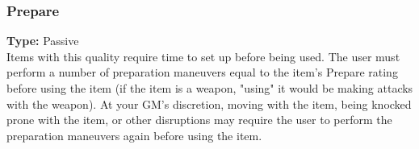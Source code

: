 \subsubsection{Prepare}
\label{iqty:prepare}
\textbf{Type:} Passive\\
Items with this quality require time to set up before
being used. The user must perform a number of
preparation maneuvers equal to the item’s Prepare
rating before using the item (if the item is a weapon,
"using" it would be making attacks with the weapon).
At your GM’s discretion, moving with the item, being
knocked prone with the item, or other disruptions may
require the user to perform the preparation maneuvers
again before using the item.
